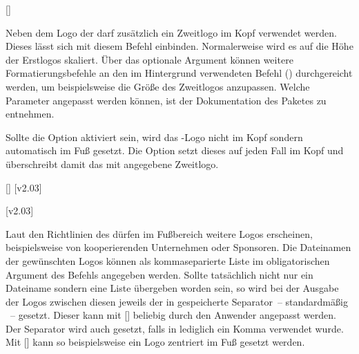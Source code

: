 \begin{DeclareEntity*}{}
\begin{DeclareEntity*}{}
\begin{DeclareEntity*}{}
\begin{Declaration}
  {[\OList{}]}

Neben dem Logo der \TnUD darf zusätzlich ein Zweitlogo im Kopf verwendet 
werden. Dieses lässt sich mit diesem Befehl einbinden. Normalerweise wird es 
auf die Höhe der Erstlogos skaliert. Über das optionale Argument können weitere 
Formatierungsbefehle an den im Hintergrund verwendeten Befehl 
() durchgereicht werden, um 
beispielsweise die Größe des Zweitlogos anzupassen. Welche Parameter angepasst 
werden können, ist der Dokumentation des Paketes  zu 
entnehmen.

Sollte die Option  aktiviert sein, wird das \DDC-Logo nicht im Kopf 
sondern automatisch im Fuß gesetzt. Die Option  setzt dieses 
auf jeden Fall im Kopf und überschreibt damit das mit  
angegebene Zweitlogo.
\end{Declaration}

\begin{Declaration}
  {[\OList{}]}
  [v2.03]
\begin{Declaration}
  {}
  [v2.03]

%
Laut den Richtlinien des \CDs dürfen im Fußbereich weitere Logos erscheinen, 
beispielsweise von kooperierenden Unternehmen oder Sponsoren. Die Dateinamen 
der gewünschten Logos können als kommaseparierte Liste im obligatorischen 
Argument des Befehls  angegeben werden. Sollte tatsächlich 
nicht nur ein Dateiname sondern eine Liste übergeben worden sein, so wird bei 
der Ausgabe der Logos zwischen diesen jeweils der in  
gespeicherte Separator~-- standardmäßig ~-- gesetzt. Dieser kann 
mit [\MPValue{\dots}] 
beliebig durch den Anwender angepasst werden. Der Separator wird auch gesetzt, 
falls in  lediglich ein Komma verwendet wurde. Mit 
[] kann so beispielsweise ein 
Logo zentriert im Fuß gesetzt werden.


\end{Declaration}
\end{Declaration}
\end{DeclareEntity*}
\end{DeclareEntity*}
\end{DeclareEntity*}
